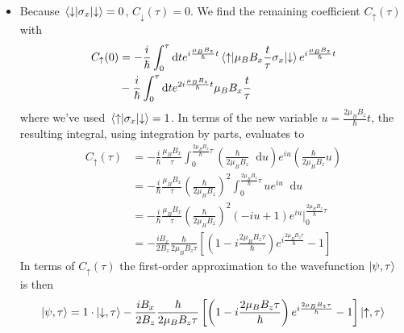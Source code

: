 \documentclass[11pt, a4paper]{article}
\newcommand{\diff}{\mathop{}\!\mathrm{d}} %
\newcommand{\p}{\psi}  %
\newcommand{\ua}{\uparrow}  %
\newcommand{\da}{\downarrow}  %
\begin{document}
\begin{itemize}
	\item Because $ \mel{\da}{\sigma_{x}}{\da} = 0 $, $ C_{\da}(\tau) = 0 $. We find the remaining coefficient $ C_{\ua}(\tau) $ with
	\begin{align*}
		C_{\ua}(0) &= - \frac{i}{\hbar}\int_{0}^{\tau} \diff t e^{i\frac{\mu_{B}B_{z}}{\hbar}t}\mel{\ua}{\mu_{B}B_{x}\frac{t}{\tau}\sigma_{x}}{\da} e^{i\frac{\mu_{B}B_{z}}{\hbar}t}\\
		&- \frac{i}{\hbar}\int_{0}^{\tau} \diff t e^{2i\frac{\mu_{B}B_{z}}{\hbar}t} \mu_{B}B_{x}\frac{t}{\tau}
	\end{align*}
	where we've used $ \mel{\ua}{\sigma_{x}}{\da} = 1$. In terms of the new variable $ u = \frac{2\mu_{B}B_{z}}{\hbar}t $, the resulting integral, using integration by parts, evaluates to
	\begin{align*}
		C_{\ua}(\tau) &= - \frac{i}{\hbar}\frac{\mu_{B}B_{x}}{\tau} \int_{0}^{ \frac{2\mu_{B}B_{z}}{\hbar}\tau} \left(\frac{\hbar}{2\mu_{B}B_{z}}\diff u\right) e^{iu} \left(\frac{\hbar}{2\mu_{B}B_{z}}u\right) \\
		& = - \frac{i}{\hbar}\frac{\mu_{B}B_{x}}{\tau} \left(\frac{\hbar}{2\mu_{B}B_{z}}\right)^{2} \int_{0}^{ \frac{2\mu_{B}B_{z}}{\hbar}\tau} ue^{iu}\diff u\\
		& = - \frac{i}{\hbar}\frac{\mu_{B}B_{x}}{\tau} \left(\frac{\hbar}{2\mu_{B}B_{z}}\right)^{2}  \left(-iu + 1\right)e^{iu}\bigg |_{0}^{\frac{2\mu_{B}B_{z}}{\hbar}\tau}\\
		& = -\frac{iB_{x}}{2B_{z}} \frac{\hbar}{2\mu_{B}B_{z}\tau} \left[\left(1 - i \frac{2\mu_{B}B_{z}\tau}{\hbar}\right)e^{i\frac{2\mu_{B}B_{z}\tau}{\hbar}} - 1\right]
	\end{align*}
	In terms of $ C_{\ua}(\tau) $ the first-order approximation to the wavefunction $ \ket{\p, \tau} $ is then
	\begin{equation*}
		\ket{\p, \tau} = 1 \cdot \ket{\da, \tau} -\frac{iB_{x}}{2B_{z}} \frac{\hbar}{2\mu_{B}B_{z}\tau} \left[\left(1 - i \frac{2\mu_{B}B_{z}\tau}{\hbar}\right)e^{i\frac{2\mu_{B}B_{z}\tau}{\hbar}} - 1\right]\ket{\ua, \tau}
	\end{equation*}
\end{itemize}
\end{document}
